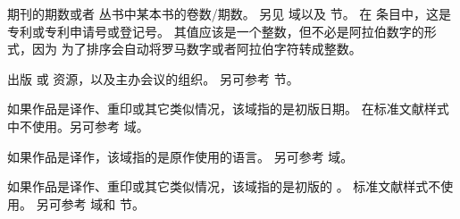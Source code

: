 \begin{fieldlist}

期刊的期数或者  丛书中某本书的卷数\slash 期数。
另见  域以及  节。
在  条目中，这是专利或专利申请号或登记号。
其值应该是一个整数，但不必是阿拉伯数字的形式，因为 \biber 为了排序会自动将罗马数字或者阿拉伯字符转成整数。




出版  或  资源，以及主办会议的组织。
另可参考  节。




如果作品是译作、重印或其它类似情况，该域指的是初版日期。
在标准文献样式中不使用。另可参考  域。






如果作品是译作，该域指的是原作使用的语言。
另可参考  域。




如果作品是译作、重印或其它类似情况，该域指的是初版的 。
标准文献样式不使用。
另可参考  域和  节。


\end{fieldlist}
